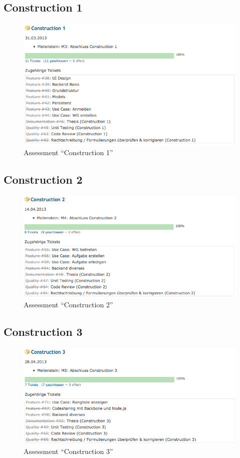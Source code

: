 \subsection*{Construction 1}
\begin{figure}[H]
	\centering
	\includegraphics[width=13cm]{content/appendix/projectmanagement/images/assessment/construction1.png}
	\caption{Assessment ``Construction 1''}
\end{figure}

\subsection*{Construction 2}
\begin{figure}[H]
	\centering
	\includegraphics[width=13cm]{content/appendix/projectmanagement/images/assessment/construction2.png}
	\caption{Assessment ``Construction 2''}
\end{figure}

\subsection*{Construction 3}
\begin{figure}[H]
	\centering
	\includegraphics[width=13cm]{content/appendix/projectmanagement/images/assessment/construction3.png}
	\caption{Assessment ``Construction 3''}
\end{figure}

